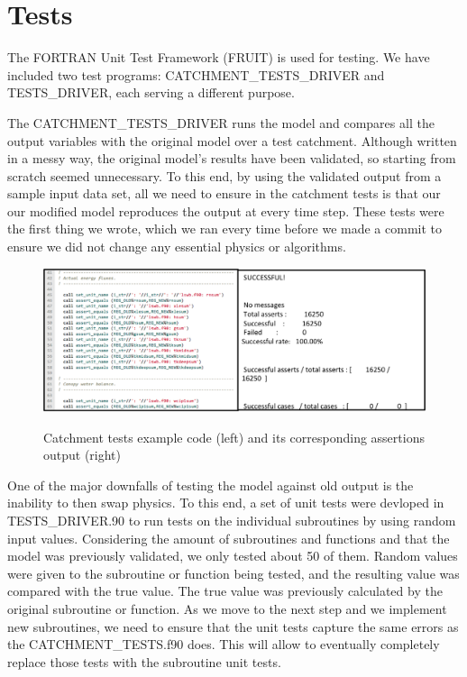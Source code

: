 \documentclass[pdftex,12pt,a4paper]{article}
\begin{document}
\section{Tests}

The FORTRAN Unit Test Framework (FRUIT) is used for testing. We have included two test programs: CATCHMENT\_TESTS\_DRIVER and TESTS\_DRIVER, each serving a different purpose.

The CATCHMENT\_TESTS\_DRIVER runs the model and compares all the output variables with the original model over a test catchment. Although written in a messy way, the original model's results have been validated, so starting from scratch seemed unnecessary. To this end, by using the validated output from a sample input data set, all we need to ensure in the catchment tests is that our our modified model reproduces the output at every time step. These tests were the first thing we wrote, which we ran every time before we made a commit to ensure we did not change any essential physics or algorithms. 

\begin{figure}[h]
	\centering
	\includegraphics[width=5.5in]{Figures/Tests1.png}
	\label{Tests1}
	\caption{Catchment tests example code (left) and its corresponding assertions output (right)}
\end{figure}

One of the major downfalls of testing the model against old output is the inability to then swap physics. To this end, a set of unit tests were devloped in TESTS\_DRIVER.90 to run tests on the individual subroutines by using random input values.  Considering the amount of subroutines and functions and that the model was previously validated, we only tested about 50 of them. Random values were given to the subroutine or function being tested, and the resulting value was compared with the true value. The true value was previously calculated by the original subroutine or function. As we move to the next step and we implement new subroutines, we need to ensure that the unit tests capture the same errors as the CATCHMENT\_TESTS.f90 does. This will allow to eventually completely replace those tests with the subroutine unit tests.
\end{document}
